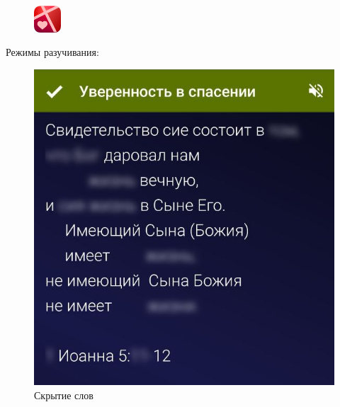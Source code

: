 \documentclass[t,aspectratio=169,14pt]{beamer}  %
\begin{document}
\begin{frame}[c]
	\frametitle{\insertsection}
	\begin{figure}
		\begin{flushright}
		\vspace{-1.5cm}
		\includegraphics[width=1cm]{remember-me-logo}
	\end{flushright}
		\end{figure}

	Режимы разучивания:
	 \begin{multicols}{2}
		\begin{center}
			\begin{figure}
			\includegraphics[height=0.55\textheight]{remember-me-card-hide}
			\caption{Скрытие слов}
			\end{figure}
			\begin{figure}

\end{figure}
\end{center}
\end{multicols}
\end{frame}
\end{document}
